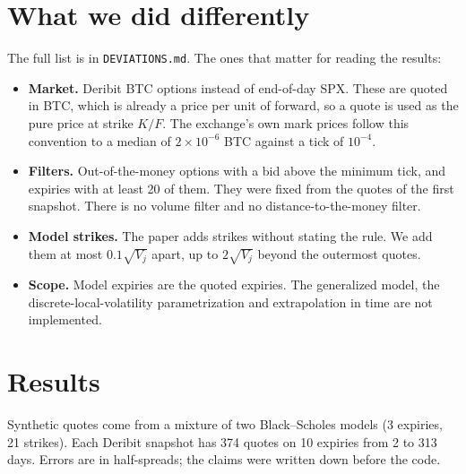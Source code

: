 \documentclass[11pt,a4paper]{article}
\begin{document}
\section{What we did differently}

The full list is in \texttt{DEVIATIONS.md}. The ones that matter for reading the results:
\begin{itemize}
\item \textbf{Market.} Deribit BTC options instead of end-of-day SPX. These are quoted in
  BTC, which is already a price per unit of forward, so a quote is used as the pure price
  at strike $K/F$. The exchange's own mark prices follow this convention to a median of
  $2\times10^{-6}$ BTC against a tick of $10^{-4}$.
\item \textbf{Filters.} Out-of-the-money options with a bid above the minimum tick, and
  expiries with at least 20 of them. They were fixed from the quotes of the first snapshot.
  There is no volume filter and no distance-to-the-money filter.
\item \textbf{Model strikes.} The paper adds strikes without stating the rule. We add them
  at most $0.1\sqrt{V_j}$ apart, up to $2\sqrt{V_j}$ beyond the outermost quotes.
\item \textbf{Scope.} Model expiries are the quoted expiries. The generalized model, the
  discrete-local-volatility parametrization and extrapolation in time are not implemented.
\end{itemize}

\section{Results}

Synthetic quotes come from a mixture of two Black--Scholes models (3 expiries, 21
strikes). Each Deribit snapshot has 374 quotes on 10 expiries from 2 to 313 days. Errors
are in half-spreads; the claims were written down before the code.
\end{document}
